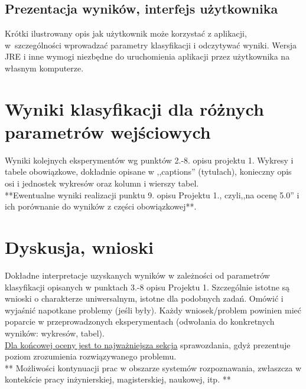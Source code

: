 \documentclass{classrep}
\begin{document}
\newpage

\subsection{Prezentacja wyników, interfejs użytkownika} 
Krótki ilustrowany opis jak użytkownik może korzystać z aplikacji, w~szczególności wprowadzać parametry klasyfikacji i odczytywać wyniki. Wersja JRE i inne wymogi
niezbędne do uruchomienia aplikacji przez użytkownika na własnym komputerze. \\

\section{Wyniki klasyfikacji dla różnych parametrów wejściowych}
Wyniki kolejnych eksperymentów wg punktów 2.-8. opisu projektu 1.  Wykresy i tabele
obowiązkowe, dokładnie opisane w ,,captions'' (tytułach), konieczny opis osi i
jednostek wykresów oraz kolumn i wierszy tabel.\\ 

{**Ewentualne wyniki realizacji punktu 9. opisu Projektu 1., czyli,,na ocenę 5.0'' i ich porównanie do wyników z
części obowiązkowej**.}\\



\section{Dyskusja, wnioski}
Dokładne interpretacje uzyskanych wyników w zależności od parametrów klasyfikacji
opisanych w punktach 3.-8 opisu Projektu 1. 
Szczególnie istotne są wnioski o charakterze uniwersalnym, istotne dla podobnych zadań. 
Omówić i wyjaśnić napotkane problemy (jeśli były). Każdy wniosek/problem powinien mieć poparcie
w przeprowadzonych eksperymentach (odwołania do konkretnych wyników: wykresów,
tabel). \\
\underline{Dla końcowej oceny jest to najważniejsza sekcja} sprawozdania, gdyż prezentuje poziom
zrozumienia rozwiązywanego problemu.\\

** Możliwości kontynuacji prac w obszarze systemów rozpoznawania, zwłaszcza w kontekście pracy inżynierskiej,
magisterskiej, naukowej, itp. **\\
\end{document}
